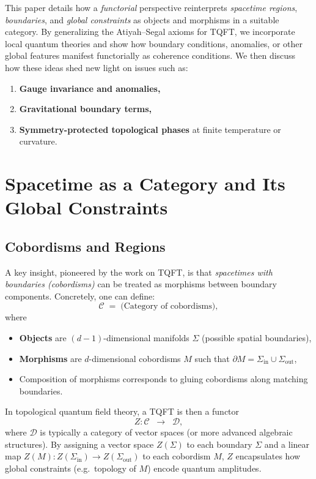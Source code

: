 \documentclass[12pt]{article}
\begin{document}
This paper details how a \emph{functorial} perspective reinterprets \emph{spacetime regions}, \emph{boundaries}, and \emph{global constraints}
as objects and morphisms in a suitable category. By generalizing the Atiyah--Segal axioms for TQFT, we incorporate local quantum theories
and show how boundary conditions, anomalies, or other global features manifest functorially as coherence conditions. 
We then discuss how these ideas shed new light on issues such as:
\begin{enumerate}[label=(\roman*)]
    \item \textbf{Gauge invariance and anomalies,}
    \item \textbf{Gravitational boundary terms,} 
    \item \textbf{Symmetry-protected topological phases} at finite temperature or curvature.
\end{enumerate}

\section{Spacetime as a Category and Its Global Constraints}
\label{sec:SpacetimeAsCategory}

\subsection{Cobordisms and Regions}
A key insight, pioneered by the work on TQFT, is that \emph{spacetimes with boundaries (cobordisms)} can be treated
as morphisms between boundary components. Concretely, one can define:
\[
\mathcal{C} \;=\; \text{(Category of cobordisms)},
\]
where
\begin{itemize}
    \item \textbf{Objects} are $(d-1)$-dimensional manifolds $\Sigma$ (possible spatial boundaries),
    \item \textbf{Morphisms} are $d$-dimensional cobordisms $M$ such that $\partial M = \Sigma_{\mathrm{in}} \cup \Sigma_{\mathrm{out}}$,
    \item Composition of morphisms corresponds to gluing cobordisms along matching boundaries.
\end{itemize}
In topological quantum field theory, a TQFT is then a functor
\[
Z: \mathcal{C} \;\;\longrightarrow\;\; \mathcal{D},
\]
where $\mathcal{D}$ is typically a category of vector spaces (or more advanced algebraic structures). 
By assigning a vector space $Z(\Sigma)$ to each boundary $\Sigma$ and a linear map $Z(M): Z(\Sigma_{\mathrm{in}}) \to Z(\Sigma_{\mathrm{out}})$
to each cobordism $M$, $Z$ encapsulates how global constraints (e.g.\ topology of $M$) encode quantum amplitudes.
\end{document}
